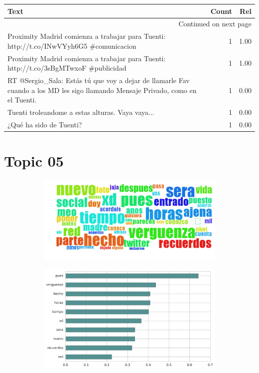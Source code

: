 \begin{longtable}{p{12.5cm}rr}
\toprule
Text & Count & Rel \\
\midrule
\endhead
\midrule
\multicolumn{3}{r}{{Continued on next page}} \\
\midrule
\endfoot

\bottomrule
\endlastfoot
Proximity Madrid comienza a trabajar para Tuenti:  http://t.co/INwVYyh6G5 \#comunicacion & 1 & 1.00 \\
Proximity Madrid comienza a trabajar para Tuenti:  http://t.co/3sBgMTwxoF \#publicidad & 1 & 1.00 \\
RT @Sergio\_Sala: Estás tú que voy a dejar de llamarle Fav cuando a los MD les sigo llamando Mensaje Privado, como en el Tuenti. & 1 & 0.00 \\
Tuenti troleandome a estas alturas. Vaya vaya... & 1 & 0.00 \\
¿Qué ha sido de Tuenti? & 1 & 0.00 \\

\end{longtable}
\clearpage

\section{Topic 05}

\begin{figure}[htbp!]
    \centering
    \begin{subfigure}[b]{0.49\textwidth}
        \includegraphics[width=\textwidth]{twitter_murcia/report_images/topic-05-wordcloud.jpg}
    \end{subfigure}
    \begin{subfigure}[b]{0.49\textwidth}
        \includegraphics[width=\textwidth]{twitter_murcia/report_images/topic-05-terms.jpg}
    \end{subfigure}
\end{figure}


